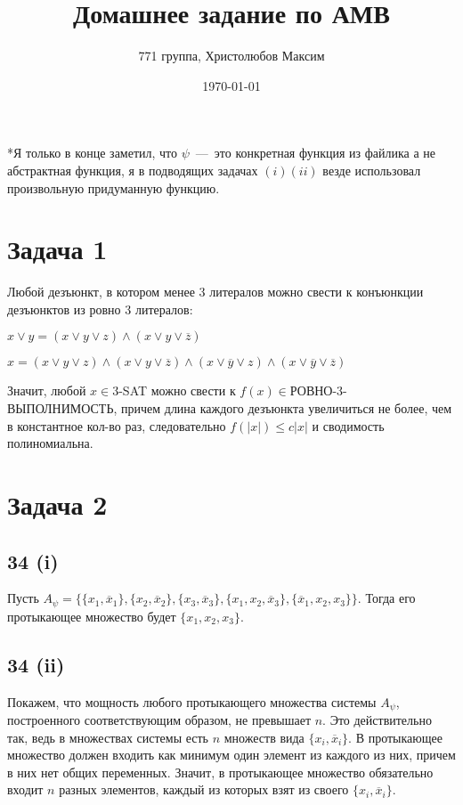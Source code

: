 \documentclass[a4paper,12pt]{article} %
\author{771 группа, Христолюбов Максим}
\title{Домашнее задание по АМВ}
\date{\today}
\begin{document}
	
	\maketitle

*Я только в конце заметил, что $\psi$~---~это конкретная функция из файлика а не абстрактная функция, я в подводящих задачах $(i) (ii)$ везде использовал произвольную придуманную функцию.

\section{Задача 1}
\hspace{5mm}
Любой дезъюнкт, в котором менее 3 литералов можно свести к конъюнкции дезъюнктов из ровно 3 литералов:

$x\vee y=(x\vee y\vee z)\wedge (x\vee y\vee\overline z)$

$x=(x\vee y\vee z)\wedge (x\vee y\vee\overline z)\wedge (x\vee\overline y\vee z)\wedge (x\vee\overline y\vee\overline z)$

Значит, любой $x\in$3-SAT можно свести к $f(x)\in$РОВНО-3-ВЫПОЛНИМОСТЬ, причем длина каждого дезъюнкта увеличиться не более, чем в константное кол-во раз, следовательно $f(|x|)\leq c|x|$ и сводимость полиномиальна.

\section{Задача 2}
\subsection{34 (i)}
\hspace{5mm}
Пусть $A_{\psi}=\{\{x_1,\overline x_1\}, \{x_2,\overline x_2\},\{x_3,\overline x_3\},\{x_1,x_2,\overline x_3\},\{\overline x_1,x_2,x_3\}\}$. Тогда его протыкающее множество будет $\{x_1,x_2,x_3\}$.

\subsection{34 (ii)}
\hspace{5mm}
Покажем, что мощность любого протыкающего множества системы $A_{\psi}$, построенного соответствующим образом, не превышает $n$. Это действительно так, ведь в множествах системы есть $n$ множеств вида $\{x_i,\overline x_i\}$. В протыкающее множество должен входить как минимум один элемент из каждого из них, причем в них нет общих переменных. Значит, в протыкающее множество обязательно входит $n$ разных элементов, каждый из которых взят из своего $\{x_i,\overline x_i\}$.
\end{document}
